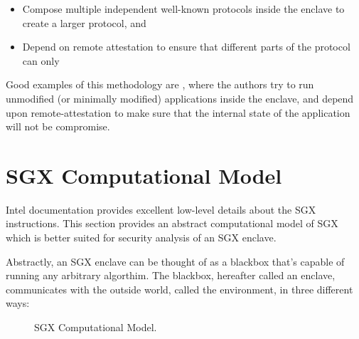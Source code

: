 \documentclass[11pt]{article}
\newcommand{\env}{\textsf{environment}}
\begin{document}
  \begin{itemize}
    \item Compose multiple independent well-known protocols inside the
      enclave to create a larger protocol, and

    \item Depend on remote attestation to ensure that different parts
      of the protocol can only
  \end{itemize}

  Good examples of this methodology are \cite{Haven, Graphene, Scone},
  where the authors try to run unmodified (or minimally modified)
  applications inside the enclave, and depend upon remote-attestation
  to make sure that the internal state of the application will not be
  compromise.

  \section{SGX Computational Model}
  \label{sec:model}
  Intel documentation\cite{intelsdm} provides excellent low-level
  details about the SGX instructions. This section provides an
  abstract computational model of SGX which is better suited for
  security analysis of an SGX enclave.

  Abstractly, an SGX enclave can be thought of as a blackbox that's
  capable of running any arbitrary algorthim. The blackbox, hereafter
  called an enclave, communicates with the outside world, called the
  \env, in three different ways:

  \begin{figure}[h]
  \centering
  
  \caption{SGX Computational Model.}
  \label{fig:model}
  \end{figure}
\end{document}
